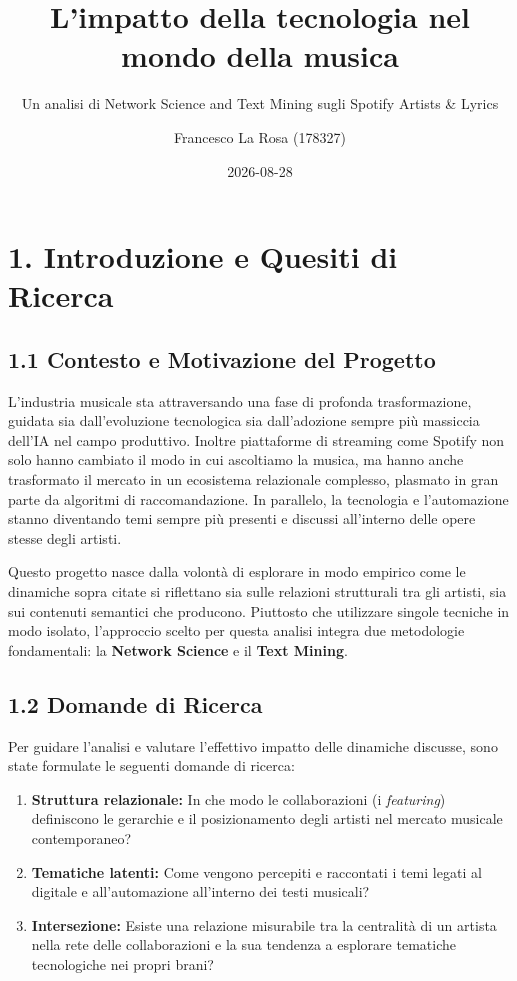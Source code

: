 \documentclass[
]{article}
\title{L'impatto della tecnologia nel mondo della musica}
\subtitle{Un analisi di Network Science and Text Mining sugli Spotify
Artists \& Lyrics}
\author{Francesco La Rosa (178327)}
\date{2026-08-28}
\begin{document}
\maketitle

{
\setcounter{tocdepth}{2}
\tableofcontents
}
\section{1. Introduzione e Quesiti di
Ricerca}\label{introduzione-e-quesiti-di-ricerca}

\subsection{1.1 Contesto e Motivazione del
Progetto}\label{contesto-e-motivazione-del-progetto}

L'industria musicale sta attraversando una fase di profonda
trasformazione, guidata sia dall'evoluzione tecnologica sia
dall'adozione sempre più massiccia dell'IA nel campo produttivo. Inoltre
piattaforme di streaming come Spotify non solo hanno cambiato il modo in
cui ascoltiamo la musica, ma hanno anche trasformato il mercato in un
ecosistema relazionale complesso, plasmato in gran parte da algoritmi di
raccomandazione. In parallelo, la tecnologia e l'automazione stanno
diventando temi sempre più presenti e discussi all'interno delle opere
stesse degli artisti.

Questo progetto nasce dalla volontà di esplorare in modo empirico come
le dinamiche sopra citate si riflettano sia sulle relazioni strutturali
tra gli artisti, sia sui contenuti semantici che producono. Piuttosto
che utilizzare singole tecniche in modo isolato, l'approccio scelto per
questa analisi integra due metodologie fondamentali: la \textbf{Network
Science} e il \textbf{Text Mining}.

\subsection{1.2 Domande di Ricerca}\label{domande-di-ricerca}

Per guidare l'analisi e valutare l'effettivo impatto delle dinamiche
discusse, sono state formulate le seguenti domande di ricerca:

\begin{enumerate}
\def\labelenumi{\arabic{enumi}.}
\item
  \textbf{Struttura relazionale:} In che modo le collaborazioni (i
  \emph{featuring}) definiscono le gerarchie e il posizionamento degli
  artisti nel mercato musicale contemporaneo?
\item
  \textbf{Tematiche latenti:} Come vengono percepiti e raccontati i temi
  legati al digitale e all'automazione all'interno dei testi musicali?
\item
  \textbf{Intersezione:} Esiste una relazione misurabile tra la
  centralità di un artista nella rete delle collaborazioni e la sua
  tendenza a esplorare tematiche tecnologiche nei propri brani?
\end{enumerate}
\end{document}

